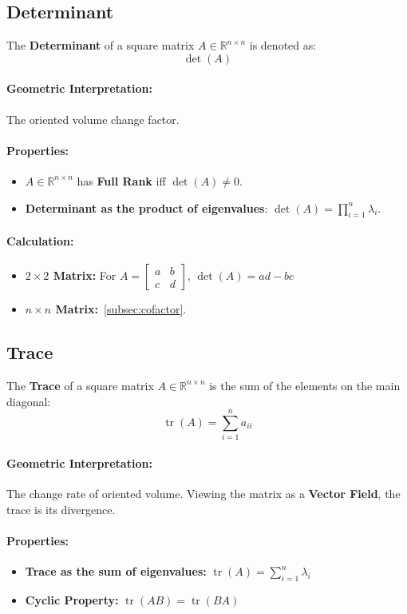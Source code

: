 \documentclass{article}
\begin{document}
\subsection{Determinant}
The \textbf{Determinant} of a square matrix $A \in \mathbb{R}^{n \times n}$ is denoted as:
\[
    \det(A)
\]
\paragraph{Geometric Interpretation:} The oriented volume change factor.
\paragraph{Properties:}
\begin{itemize}
    \item $A \in \mathbb{R}^{n \times n}$ has \textbf{Full Rank} iff $\det(A) \neq 0$.
    \item \textbf{Determinant as the product of eigenvalues}: $\det(A) = \prod_{i=1}^n \lambda_i$.
\end{itemize}
\paragraph{Calculation:}
\begin{itemize}
    \item \textbf{$2 \times 2$ Matrix:} For $A = \begin{bmatrix} a & b \\ c & d \end{bmatrix}$, $\det(A) = ad - bc$
    \item \textbf{$n \times n$ Matrix:}~\ref{subsec:cofactor}.
\end{itemize}

\subsection{Trace}
The \textbf{Trace} of a square matrix $A \in \mathbb{R}^{n \times n}$ is the sum of the elements on the main diagonal:
\[
    \operatorname{tr}(A) = \sum_{i=1}^n a_{ii}
\]
\paragraph{Geometric Interpretation:} The change rate of oriented volume. Viewing the matrix as a \textbf{Vector Field}, the trace is its divergence.
\paragraph{Properties:}
\begin{itemize}
    \item \textbf{Trace as the sum of eigenvalues:} $\operatorname{tr}(A) = \sum_{i=1}^n \lambda_i$
    \item \textbf{Cyclic Property:} $\operatorname{tr}(AB) = \operatorname{tr}(BA)$
\end{itemize}
\end{document}
